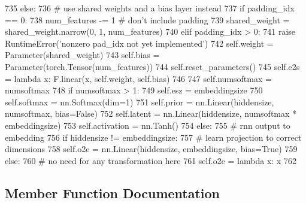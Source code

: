 \begin{DoxyCode}
735         \textcolor{keywordflow}{else}:
736             \textcolor{comment}{# use shared weights and a bias layer instead}
737             \textcolor{keywordflow}{if} padding\_idx == 0:
738                 num\_features -= 1  \textcolor{comment}{# don't include padding}
739                 shared\_weight = shared\_weight.narrow(0, 1, num\_features)
740             \textcolor{keywordflow}{elif} padding\_idx > 0:
741                 \textcolor{keywordflow}{raise} RuntimeError(\textcolor{stringliteral}{'nonzero pad\_idx not yet implemented'})
742             self.weight = Parameter(shared\_weight)
743             self.bias = Parameter(torch.Tensor(num\_features))
744             self.reset\_parameters()
745             self.e2s = \textcolor{keyword}{lambda} x: F.linear(x, self.weight, self.bias)
746 
747         self.numsoftmax = numsoftmax
748         \textcolor{keywordflow}{if} numsoftmax > 1:
749             self.esz = embeddingsize
750             self.softmax = nn.Softmax(dim=1)
751             self.prior = nn.Linear(hiddensize, numsoftmax, bias=\textcolor{keyword}{False})
752             self.latent = nn.Linear(hiddensize, numsoftmax * embeddingsize)
753             self.activation = nn.Tanh()
754         \textcolor{keywordflow}{else}:
755             \textcolor{comment}{# rnn output to embedding}
756             \textcolor{keywordflow}{if} hiddensize != embeddingsize:
757                 \textcolor{comment}{# learn projection to correct dimensions}
758                 self.o2e = nn.Linear(hiddensize, embeddingsize, bias=\textcolor{keyword}{True})
759             \textcolor{keywordflow}{else}:
760                 \textcolor{comment}{# no need for any transformation here}
761                 self.o2e = \textcolor{keyword}{lambda} x: x
762 
\end{DoxyCode}


\subsection{Member Function Documentation}
\mbox{\label{classprojects_1_1controllable__dialogue_1_1controllable__seq2seq_1_1modules_1_1OutputLayer_a38fcafa8abd1574ef85240804ef2393a}} 
